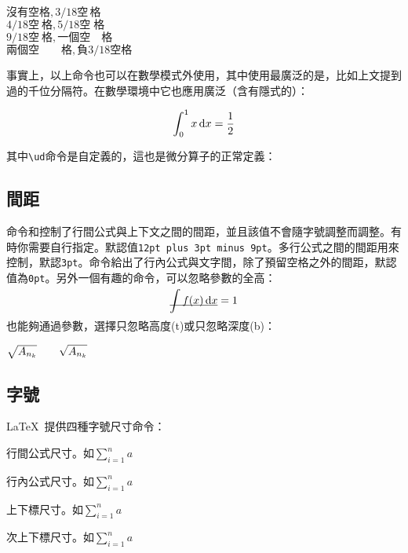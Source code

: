 \begin{codeshow}
  $沒有空格,3/18空\,格$ \\
  $4/18空\:格,5/18空\;格$ \\
  $9/18空\ 格,一個空\quad 格$ \\
  $兩個空\qquad 格,負3/18空\!格$
\end{codeshow}

事實上，以上命令也可以在數學模式外使用，其中使用最廣泛的是\latexline{,}，比如上文提到過的千位分隔符。在數學環境中它也應用廣泛（含有隱式的\latexline{,}）：

\begin{codeshow}
\[ \int_0^1 x \ud{}x
= \frac{1}{2} \]
\end{codeshow}

其中\verb|\ud|命令是自定義的，這也是微分算子的正常定義\label{cmd:ud}：
\begin{latex}
\newcommand{\ud}{\mathop{}\negthinspace\mathrm{d}}
\end{latex}

\subsection{間距}
命令和控制了行間公式與上下文之間的間距，並且該值不會隨字號調整而調整。有時你需要自行指定。默認值\texttt{12pt plus 3pt minus 9pt}。多行公式之間的間距用來控制，默認\texttt{3pt}。命令給出了行內公式與文字間，除了預留空格之外的間距，默認值為\texttt{0pt}。另外一個有趣的命令，可以忽略參數的全高：
\begin{codeshow}
\[\underline{\smash{\int f(x)\ud x}}=1\]
\end{codeshow}

也能夠通過參數，選擇只忽略高度(t)或只忽略深度(b)：
\begin{codeshow}
$\sqrt{A_{n_k}} \qquad
\sqrt{\smash[b]{A_{n_k}}}$
\end{codeshow}

\subsection{字號}
\LaTeX\ 提供四種字號尺寸命令：
\begin{para}
\item[\latexline{displaystyle}] 行間公式尺寸。如$\displaystyle \sum_{i=1}^n a$
\item[\latexline{textstyle}] 行內公式尺寸。如$\textstyle \sum_{i=1}^n a$
\item[\latexline{scriptstyle}] 上下標尺寸。如$\scriptstyle \sum_{i=1}^n a$
\item[\latexline{scriptscriptstyle}] 次上下標尺寸。如$\scriptscriptstyle \sum_{i=1}^n a$
\end{para}


